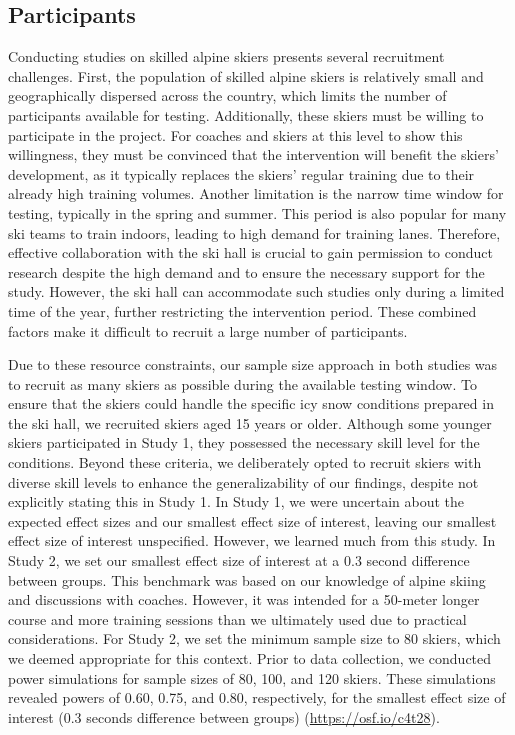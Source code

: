 \subsection{Participants}
Conducting studies on skilled alpine skiers presents several recruitment challenges. First, the population of skilled alpine skiers is relatively small and geographically dispersed across the country, which limits the number of participants available for testing. Additionally, these skiers must be willing to participate in the project. For coaches and skiers at this level to show this willingness, they must be convinced that the intervention will benefit the skiers' development, as it typically replaces the skiers' regular training due to their already high training volumes. Another limitation is the narrow time window for testing, typically in the spring and summer. This period is also popular for many ski teams to train indoors, leading to high demand for training lanes. Therefore, effective collaboration with the ski hall is crucial to gain permission to conduct research despite the high demand and to ensure the necessary support for the study. However, the ski hall can accommodate such studies only during a limited time of the year, further restricting the intervention period. These combined factors make it difficult to recruit a large number of participants.

Due to these resource constraints, our sample size approach in both studies was to recruit as many skiers as possible during the available testing window. To ensure that the skiers could handle the specific icy snow conditions prepared in the ski hall, we recruited skiers aged 15 years or older. Although some younger skiers participated in Study 1, they possessed the necessary skill level for the conditions. Beyond these criteria, we deliberately opted to recruit skiers with diverse skill levels to enhance the generalizability of our findings, despite not explicitly stating this in Study 1. In Study 1, we were uncertain about the expected effect sizes and our smallest effect size of interest, leaving our smallest effect size of interest unspecified. However, we learned much from this study. In Study 2, we set our smallest effect size of interest at a 0.3 second difference between groups. This benchmark was based on our knowledge of alpine skiing and discussions with coaches. However, it was intended for a 50-meter longer course and more training sessions than we ultimately used due to practical considerations. For Study 2, we set the minimum sample size to 80 skiers, which we deemed appropriate for this context. Prior to data collection, we conducted power simulations for sample sizes of 80, 100, and 120 skiers. These simulations revealed powers of 0.60, 0.75, and 0.80, respectively, for the smallest effect size of interest (0.3 seconds difference between groups) (\url{https://osf.io/c4t28}). 


